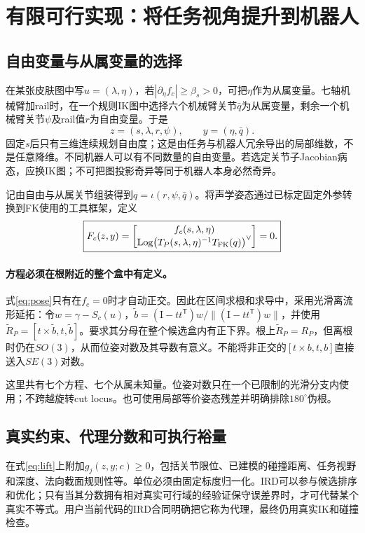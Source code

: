 \documentclass[UTF8,11pt,a4paper,fontset=fandol]{ctexart}
\numberwithin{equation}{section}
\theoremstyle{definition}
\DeclareMathOperator{\Log}{Log}
\newcommand{\Id}{\mathrm I}
\newcommand{\T}{^{\mathsf T}}
\begin{document}
\section{有限可行实现：将任务视角提升到机器人}
\subsection{自由变量与从属变量的选择}
在某张皮肤图中写$u=(\lambda,\eta)$，若$|\partial_\eta f_c|\ge\beta_s>0$，可把$\eta$作为从属变量。七轴机械臂加rail时，在一个规则IK图中选择六个机械臂关节$\bar q$为从属变量，剩余一个机械臂关节$\psi$及rail值$r$为自由变量。于是
\begin{equation}
 \boxed{z=(s,\lambda,r,\psi),\qquad y=(\eta,\bar q).}
\end{equation}
固定$s$后只有三维连续规划自由度；这是由任务与机器人冗余导出的局部维数，不是任意降维。不同机器人可以有不同数量的自由变量。若选定关节子Jacobian病态，应换IK图；不可把图投影奇异等同于机器人本身必然奇异。

记由自由与从属关节组装得到$q=\iota(r,\psi,\bar q)$。将声学姿态通过已标定固定外参转换到FK使用的工具框架，定义
\begin{equation}
 \boxed{
 F_c(z,y)=
 \begin{bmatrix}
 f_c(s,\lambda,\eta)\\
 \Log\!\left(T_P(s,\lambda,\eta)^{-1}T_{\rm FK}(q)\right)^\vee
 \end{bmatrix}=0.
 }
 \label{eq:lift}
\end{equation}

\paragraph{方程必须在根附近的整个盒中有定义。}式\eqref{eq:pose}只有在$f_c=0$时才自动正交。因此在区间求根和求导中，采用光滑离流形延拓：令$w=\gamma-S_c(u)$，$\widetilde b=(\Id-tt\T)w/\|(\Id-tt\T)w\|$，并使用$\widetilde R_P=[t\times\widetilde b,t,\widetilde b]$。要求其分母在整个候选盒内有正下界。根上$\widetilde R_P=R_P$，但离根时仍在$SO(3)$，从而位姿对数及其导数有意义。不能将非正交的$[t\times b,t,b]$直接送入$SE(3)$对数。

这里共有七个方程、七个从属未知量。位姿对数只在一个已限制的光滑分支内使用；不跨越旋转cut locus。也可使用局部等价姿态残差并明确排除$180^\circ$伪根。

\subsection{真实约束、代理分数和可执行裕量}
在式\eqref{eq:lift}上附加$g_j(z,y;c)\ge0$，包括关节限位、已建模的碰撞距离、任务视野和深度、法向截面规则性等。单位必须由固定标度归一化。IRD可以参与候选排序和优化；只有当其分数拥有相对真实可行域的经验证保守误差界时，才可代替某个真实不等式。用户当前代码的IRD合同明确把它称为代理，最终仍用真实IK和碰撞检查。
\end{document}
